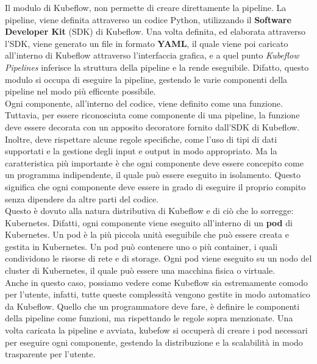 Il modulo di Kubeflow, non permette di creare direttamente la pipeline. La pipeline,
viene definita attraverso un codice Python, utilizzando
il \textbf{Software Developer Kit} (SDK) di Kubeflow. Una volta definita, ed elaborata attraverso l'SDK, viene generato
un file in formato \textbf{YAML}, il quale viene poi caricato all'interno di Kubeflow
attraverso l'interfaccia grafica, e a quel punto \textit{Kubeflow Pipelines} inferisce
la struttura della pipeline e la rende eseguibile. Difatto, questo modulo
si occupa di  eseguire la pipeline, gestendo le varie componenti della pipeline
nel modo più efficente possibile.\\


Ogni componente, all'interno del codice, viene definito come una funzione. Tuttavia,
per essere riconosciuta come componente di una pipeline, la funzione deve essere
decorata con un apposito decoratore fornito dall'SDK di Kubeflow.
Inoltre, deve rispettare alcune regole specifiche, come l'uso di tipi di dati supportati
e la gestione degli input e output in modo appropriato. Ma la caratteristica più importante
è che ogni componente deve essere concepito come un programma indipendente, il quale
può essere eseguito in isolamento. Questo significa che ogni componente deve essere in grado
di eseguire il proprio compito senza dipendere da altre parti del codice.\\


Questo è dovuto alla natura distributiva di Kubeflow e di ciò che lo sorregge: Kubernetes.
Difatti, ogni componente viene eseguito all'interno di un \textbf{pod} di Kubernetes.
Un pod è la più piccola unità eseguibile che può essere creata e gestita in Kubernetes.
Un pod può contenere uno o più container, i quali condividono le risorse di rete e di storage.
Ogni pod viene eseguito su un nodo del cluster di Kubernetes, il quale può essere una macchina fisica
o virtuale.\\


Anche in questo caso, possiamo vedere come Kubeflow sia estremamente comodo per l'utente,
infatti, tutte queste complessità vengono gestite in modo automatico da Kubeflow. Quello che
un programmatore deve fare, è definire le componenti della pipeline come funzioni, ma rispettando
le regole sopra menzionate. Una volta caricata la pipeline e avviata, kubefow si occuperà
di creare i pod necessari per eseguire ogni componente, gestendo la distribuzione e la scalabilità
in modo trasparente per l'utente.




